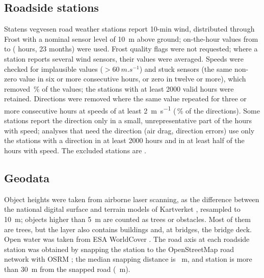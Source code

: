 \subsection{Roadside stations}
Statens vegvesen road weather stations report 10-min wind, distributed through Frost with a nominal sensor level of \SI{10}{m} above ground; on-the-hour values from \noStart{} to \noEnd{} (\noHours{} hours, 23 months) were used. Frost quality flags were not requested; where a station reports several wind sensors, their values were averaged. Speeds were checked for implausible values ($>\SI{60}{m.s^{-1}}$) and stuck sensors (the same non-zero value in six or more consecutive hours, or zero in twelve or more), which removed \noQcPct\,\% of the values; the \noTrv{} stations with at least 2000 valid hours were retained. Directions were removed where the same value repeated for three or more consecutive hours at speeds of at least \SI{2}{m.s^{-1}} (\noStuckPct\,\% of the directions). Some stations report the direction only in a small, unrepresentative part of the hours with speed; analyses that need the direction (air drag, direction errors) use only the \noDirOkN{} stations with a direction in at least 2000 hours and in at least half of the hours with speed. The \noDirExclN{} excluded stations are \noDirExclList.

\subsection{Geodata}
Object heights were taken from airborne laser scanning, as the difference between the national digital surface and terrain models of Kartverket \citep{Kartverket}, resampled to \SI{10}{m}; objects higher than \SI{5}{m} are counted as trees or obstacles. Most of them are trees, but the layer also contains buildings and, at bridges, the bridge deck. Open water was taken from ESA WorldCover \citep{WorldCover}. The road axis at each roadside station was obtained by snapping the station to the OpenStreetMap road network with OSRM \citep{Luxen2011}; the median snapping distance is \noSnapMed~m, and \noSnapOverThirty{} station is more than \SI{30}{m} from the snapped road (\noSnapMax~m).

